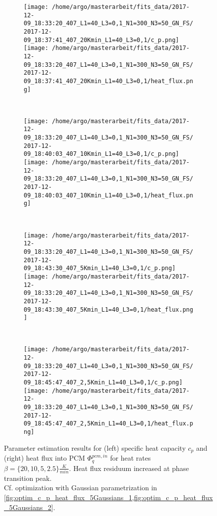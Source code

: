 \documentclass{scrartcl}[12pt, halfparskip]
\numberwithin{equation}{section}
\numberwithin{figure}{section}
\numberwithin{table}{section}
\begin{document}
\begin{figure}[H]
	\begin{subfigure}{1.\textwidth}
		\texttt{[image: /home/argo/masterarbeit/fits\_data/2017-12-09\_18:33:20\_407\_L1=40\_L3=0,1\_N1=300\_N3=50\_GN\_FS/2017-12-09\_18:37:41\_407\_20Kmin\_L1=40\_L3=0,1/c\_p.png]}
		\texttt{[image: /home/argo/masterarbeit/fits\_data/2017-12-09\_18:33:20\_407\_L1=40\_L3=0,1\_N1=300\_N3=50\_GN\_FS/2017-12-09\_18:37:41\_407\_20Kmin\_L1=40\_L3=0,1/heat\_flux.png]}
	\end{subfigure} \\[1ex]
	
	\begin{subfigure}{1.\textwidth}
		\texttt{[image: /home/argo/masterarbeit/fits\_data/2017-12-09\_18:33:20\_407\_L1=40\_L3=0,1\_N1=300\_N3=50\_GN\_FS/2017-12-09\_18:40:03\_407\_10Kmin\_L1=40\_L3=0,1/c\_p.png]}
		\texttt{[image: /home/argo/masterarbeit/fits\_data/2017-12-09\_18:33:20\_407\_L1=40\_L3=0,1\_N1=300\_N3=50\_GN\_FS/2017-12-09\_18:40:03\_407\_10Kmin\_L1=40\_L3=0,1/heat\_flux.png]}
	\end{subfigure} \\[1ex]
	
	\begin{subfigure}{1.\textwidth}
		\texttt{[image: /home/argo/masterarbeit/fits\_data/2017-12-09\_18:33:20\_407\_L1=40\_L3=0,1\_N1=300\_N3=50\_GN\_FS/2017-12-09\_18:43:30\_407\_5Kmin\_L1=40\_L3=0,1/c\_p.png]}
		\texttt{[image: /home/argo/masterarbeit/fits\_data/2017-12-09\_18:33:20\_407\_L1=40\_L3=0,1\_N1=300\_N3=50\_GN\_FS/2017-12-09\_18:43:30\_407\_5Kmin\_L1=40\_L3=0,1/heat\_flux.png]}
	\end{subfigure} \\[1ex]
	
	\begin{subfigure}{1.\textwidth}
		\texttt{[image: /home/argo/masterarbeit/fits\_data/2017-12-09\_18:33:20\_407\_L1=40\_L3=0,1\_N1=300\_N3=50\_GN\_FS/2017-12-09\_18:45:47\_407\_2,5Kmin\_L1=40\_L3=0,1/c\_p.png]}
		\texttt{[image: /home/argo/masterarbeit/fits\_data/2017-12-09\_18:33:20\_407\_L1=40\_L3=0,1\_N1=300\_N3=50\_GN\_FS/2017-12-09\_18:45:47\_407\_2,5Kmin\_L1=40\_L3=0,1/heat\_flux.png]}
	\end{subfigure}
	\caption{Parameter estimation results for (left) specific heat capacity $c_p$ and (right) heat flux into PCM $\varPhi_q^{pcm,in}$ for heat rates $\beta=\{ 20, 10, 5, 2.5 \} \frac{K}{min}$. Heat flux residuum increased at phase transition peak. \\
	Cf. optimization with Gaussian parametrization in \cref{fig:optim_c_p_heat_flux_5Gaussians_1,fig:optim_c_p_heat_flux_5Gaussians_2}.}
	\label{fig:optim_c_p_heat_flux_FS_1}
\end{figure}
\end{document}
